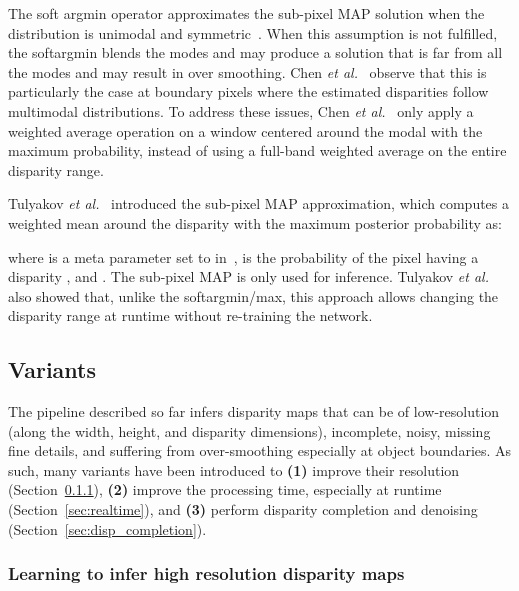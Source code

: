 \documentclass[10pt,journal,compsoc]{IEEEtran}
\newcommand{\etal}{\emph{et al.}}
\newcommand{\noi}{\noindent}
\begin{document}
\noi The soft argmin operator approximates the sub-pixel MAP solution when the distribution is unimodal and symmetric~\cite{tulyakov2018practical}. When this assumption is not fulfilled, the softargmin blends the modes and may produce a solution that is far from all the modes and may result in over smoothing. Chen \etal~\cite{Chen_2019_ICCV} observe that  this is particularly the case  at  boundary pixels  where the estimated disparities  follow multimodal distributions.  To address these issues, Chen \etal~\cite{Chen_2019_ICCV} only apply a weighted average operation on a window centered around the modal with the maximum probability, instead of using a full-band weighted average  on the entire  disparity range. 


Tulyakov \etal~\cite{tulyakov2018practical} introduced the sub-pixel MAP approximation, which computes a weighted mean around the disparity with the maximum posterior probability as:


\noi where  is a meta parameter set to  in~\cite{tulyakov2018practical},   is the probability of the pixel  having a disparity  , and  .  The sub-pixel MAP is only used for inference.  Tulyakov \etal~\cite{tulyakov2018practical} also showed that, unlike the softargmin/max, this  approach allows changing the disparity range at runtime without   re-training the network.

 



\subsection{Variants}
\label{sec:end2end_variants}

The pipeline described so far infers disparity maps that can be of low-resolution  (along the width, height, and disparity dimensions), incomplete, noisy, missing fine details, and suffering from over-smoothing especially at object boundaries.  As such, many variants have been introduced to  \textbf{(1)} improve their resolution (Section~\ref{sec:hiresdiisparity}),  \textbf{(2)} improve the processing time, especially at runtime (Section~\ref{sec:realtime}),  and \textbf{(3)} perform disparity completion and denoising (Section~\ref{sec:disp_completion}). 


\subsubsection{Learning to infer high resolution disparity maps}
\label{sec:hiresdiisparity}
\end{document}
